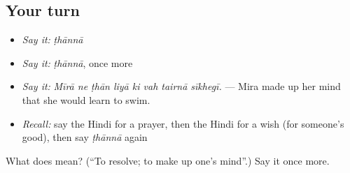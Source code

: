 \subsection*{Your turn}
\begin{itemize}
\raggedright
  \item \emph{Say it:} \emph{ṭhānnā}
  \item \emph{Say it:} \emph{ṭhānnā}, once more
  \item \emph{Say it:} \emph{Mīrā ne ṭhān liyā ki vah tairnā sīkhegī.} — Mira made up her mind that she would learn to swim.
  \item \emph{Recall:} say the Hindi for a prayer, then the Hindi for a wish (for someone's good), then say \emph{ṭhānnā} again
\end{itemize}

\begin{tcolorbox}[breakable,colback=teal!4,colframe=teal!35!black,title={Before you move on}]
What does  mean? (\textquotedblleft{}To resolve; to make up one's mind\textquotedblright{}.) Say it once more.
\end{tcolorbox}
